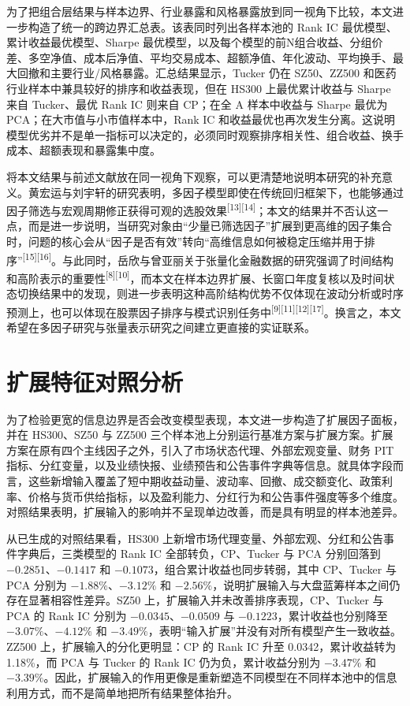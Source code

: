 为了把组合层结果与样本边界、行业暴露和风格暴露放到同一视角下比较，本文进一步构造了统一的跨边界汇总表。该表同时列出各样本池的 Rank IC 最优模型、累计收益最优模型、Sharpe 最优模型，以及每个模型的前N组合收益、分组价差、多空净值、成本后净值、平均交易成本、超额净值、年化波动、平均换手、最大回撤和主要行业/风格暴露。汇总结果显示，Tucker 仍在 SZ50、ZZ500 和医药行业样本中兼具较好的排序和收益表现，但在 HS300 上最优累计收益与 Sharpe 来自 Tucker、最优 Rank IC 则来自 CP；在全 A 样本中收益与 Sharpe 最优为 PCA；在大市值与小市值样本中，Rank IC 和收益最优也再次发生分离。这说明模型优劣并不是单一指标可以决定的，必须同时观察排序相关性、组合收益、换手成本、超额表现和暴露集中度。

将本文结果与前述文献放在同一视角下观察，可以更清楚地说明本研究的补充意义。黄宏运与刘宇轩的研究表明，多因子模型即使在传统回归框架下，也能够通过因子筛选与宏观周期修正获得可观的选股效果\textsuperscript{[13][14]}；本文的结果并不否认这一点，而是进一步说明，当研究对象由“少量已筛选因子”扩展到更高维的因子集合时，问题的核心会从“因子是否有效”转向“高维信息如何被稳定压缩并用于排序”\textsuperscript{[15][16]}。与此同时，岳欣与曾亚丽关于张量化金融数据的研究强调了时间结构和高阶表示的重要性\textsuperscript{[8][10]}，而本文在样本边界扩展、长窗口年度复核以及时间状态切换结果中的发现，则进一步表明这种高阶结构优势不仅体现在波动分析或时序预测上，也可以体现在股票因子排序与模式识别任务中\textsuperscript{[9][11][12][17]}。换言之，本文希望在多因子研究与张量表示研究之间建立更直接的实证联系。

\section{扩展特征对照分析}

为了检验更宽的信息边界是否会改变模型表现，本文进一步构造了扩展因子面板，并在 HS300、SZ50 与 ZZ500 三个样本池上分别运行基准方案与扩展方案。扩展方案在原有四个主线因子之外，引入了市场状态代理、外部宏观变量、财务 PIT 指标、分红变量，以及业绩快报、业绩预告和公告事件字典等信息。就具体字段而言，这些新增输入覆盖了短中期收益动量、波动率、回撤、成交额变化、政策利率、价格与货币供给指标，以及盈利能力、分红行为和公告事件强度等多个维度。对照结果表明，扩展输入的影响并不呈现单边改善，而是具有明显的样本池差异。

从已生成的对照结果看，HS300 上新增市场代理变量、外部宏观、分红和公告事件字典后，三类模型的 Rank IC 全部转负，CP、Tucker 与 PCA 分别回落到 $-0.2851$、$-0.1417$ 和 $-0.1073$，组合累计收益也同步转弱，其中 CP、Tucker 与 PCA 分别为 $-1.88\%$、$-3.12\%$ 和 $-2.56\%$，说明扩展输入与大盘蓝筹样本之间仍存在显著相容性差异。SZ50 上，扩展输入并未改善排序表现，CP、Tucker 与 PCA 的 Rank IC 分别为 $-0.0345$、$-0.0509$ 与 $-0.1223$，累计收益也分别降至 $-3.07\%$、$-4.12\%$ 和 $-3.49\%$，表明“输入扩展”并没有对所有模型产生一致收益。ZZ500 上，扩展输入的分化更明显：CP 的 Rank IC 升至 0.0342，累计收益转为 1.18\%，而 PCA 与 Tucker 的 Rank IC 仍为负，累计收益分别为 $-3.47\%$ 和 $-3.39\%$。因此，扩展输入的作用更像是重新塑造不同模型在不同样本池中的信息利用方式，而不是简单地把所有结果整体抬升。

